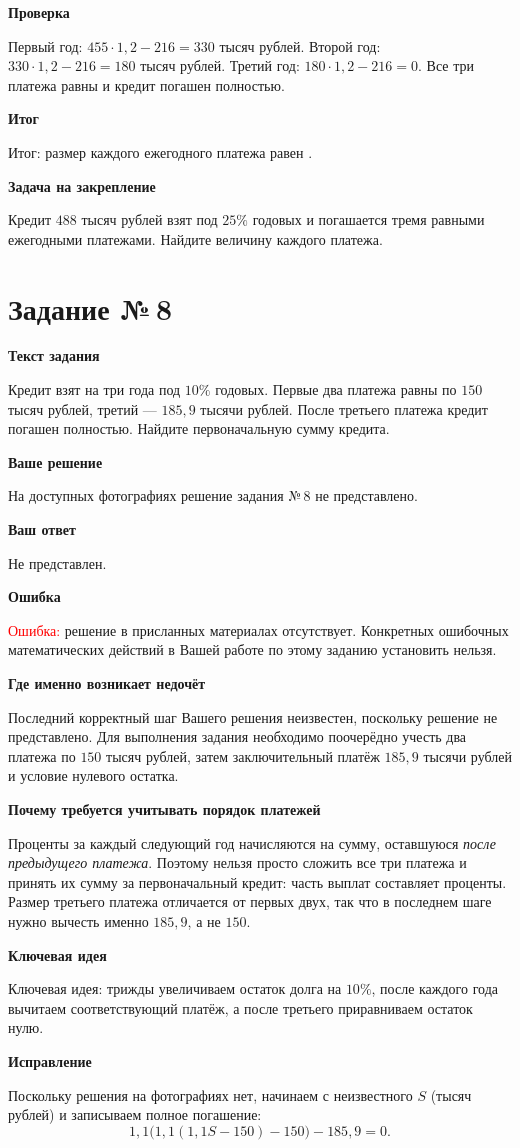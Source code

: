 \documentclass[12pt,a4paper]{article}
\newcommand{\subpart}[1]{\par\medskip\noindent\textbf{#1}\par\nobreak\smallskip}
\newcommand{\rate}{\text{ тыс. руб.}}
\begin{document}
\subpart{Проверка}
Первый год: $455\cdot1{,}2-216=330$ тысяч рублей.
Второй год: $330\cdot1{,}2-216=180$ тысяч рублей.
Третий год: $180\cdot1{,}2-216=0$.
Все три платежа равны и кредит погашен полностью.

\subpart{Итог}
\textcolor{teal!60!black}{Итог:} размер каждого ежегодного платежа
равен \boxed{216\rate}.

\subpart{Задача на закрепление}
Кредит $488$ тысяч рублей взят под $25\%$ годовых и погашается
тремя равными ежегодными платежами. Найдите величину каждого платежа.

\clearpage
{}\label{task:8}
\section*{Задание №\,8}
\subpart{Текст задания}
Кредит взят на три года под $10\%$ годовых.
Первые два платежа равны по $150$ тысяч рублей, третий ---
$185{,}9$ тысячи рублей. После третьего платежа кредит погашен
полностью. Найдите первоначальную сумму кредита.

\subpart{Ваше решение}
На доступных фотографиях решение задания №\,8 не представлено.

\subpart{Ваш ответ}
Не представлен.

\subpart{Ошибка}
\textcolor{red}{Ошибка:} решение в присланных материалах отсутствует.
Конкретных ошибочных математических действий в Вашей работе
по этому заданию установить нельзя.

\subpart{Где именно возникает недочёт}
Последний корректный шаг Вашего решения неизвестен, поскольку
решение не представлено. Для выполнения задания необходимо поочерёдно
учесть два платежа по $150$ тысяч рублей, затем заключительный
платёж $185{,}9$ тысячи рублей и условие нулевого остатка.

\subpart{Почему требуется учитывать порядок платежей}
Проценты за каждый следующий год начисляются на сумму,
оставшуюся \emph{после предыдущего платежа}. Поэтому нельзя
просто сложить все три платежа и принять их сумму за первоначальный
кредит: часть выплат составляет проценты. Размер третьего платежа
отличается от первых двух, так что в последнем шаге нужно
вычесть именно $185{,}9$, а не $150$.

\subpart{Ключевая идея}
\textcolor{blue!60!black}{Ключевая идея:} трижды увеличиваем
остаток долга на $10\%$, после каждого года вычитаем соответствующий
платёж, а после третьего приравниваем остаток нулю.

\subpart{Исправление}
Поскольку решения на фотографиях нет, начинаем с неизвестного $S$
(тысяч рублей) и записываем полное погашение:
\[
1{,}1\bigl(1{,}1(1{,}1S-150)-150\bigr)-185{,}9=0.
\]
\end{document}
